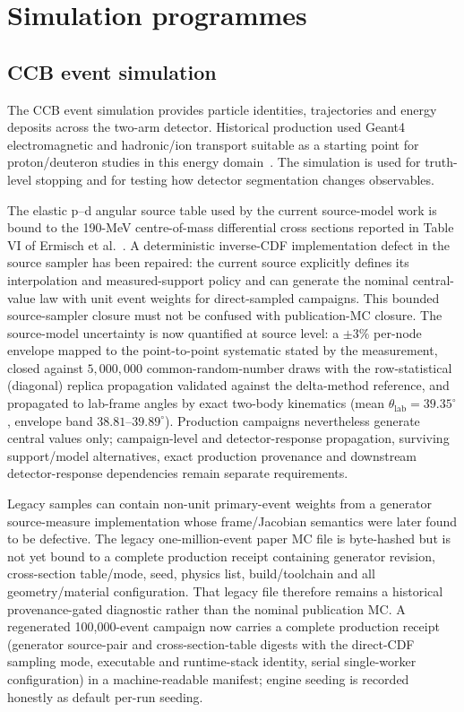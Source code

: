 \section{Simulation programmes}

\subsection{CCB event simulation}

The CCB event simulation provides particle identities, trajectories and energy deposits across the two-arm detector. Historical production used Geant4 electromagnetic and hadronic/ion transport suitable as a starting point for proton/deuteron studies in this energy domain~\cite{Agostinelli2003,Allison2016}. The simulation is used for truth-level stopping and for testing how detector segmentation changes observables.

The elastic p--d angular source table used by the current source-model work is bound to the 190-MeV centre-of-mass differential cross sections reported in Table VI of Ermisch et al.~\cite{Ermisch2005}. A deterministic inverse-CDF implementation defect in the source sampler has been repaired: the current source explicitly defines its interpolation and measured-support policy and can generate the nominal central-value law with unit event weights for direct-sampled campaigns. This bounded source-sampler closure must not be confused with publication-MC closure. The source-model uncertainty is now quantified at source level: a $\pm3\%$ per-node envelope mapped to the point-to-point systematic stated by the measurement, closed against $5{,}000{,}000$ common-random-number draws with the row-statistical (diagonal) replica propagation validated against the delta-method reference, and propagated to lab-frame angles by exact two-body kinematics (mean $\theta_\mathrm{lab}=39.35^\circ$, envelope band $38.81$--$39.89^\circ$). Production campaigns nevertheless generate central values only; campaign-level and detector-response propagation, surviving support/model alternatives, exact production provenance and downstream detector-response dependencies remain separate requirements.

Legacy samples can contain non-unit primary-event weights from a generator source-measure implementation whose frame/Jacobian semantics were later found to be defective. The legacy one-million-event paper MC file is byte-hashed but is not yet bound to a complete production receipt containing generator revision, cross-section table/mode, seed, physics list, build/toolchain and all geometry/material configuration. That legacy file therefore remains a historical provenance-gated diagnostic rather than the nominal publication MC. A regenerated 100{,}000-event campaign now carries a complete production receipt (generator source-pair and cross-section-table digests with the direct-CDF sampling mode, executable and runtime-stack identity, serial single-worker configuration) in a machine-readable manifest; engine seeding is recorded honestly as default per-run seeding.

